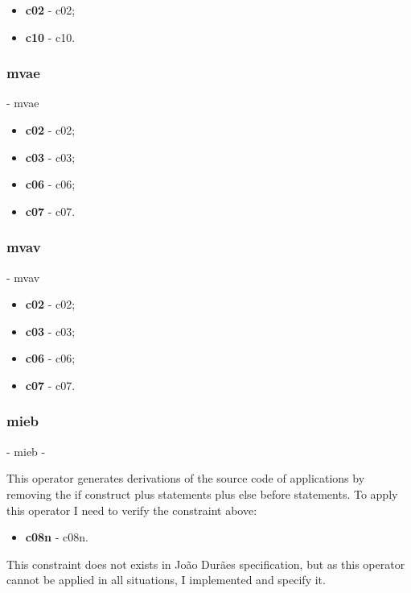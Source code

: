 	\begin{itemize}
		\item \textbf{\acs{c02}} - \Acl{c02};
		\item \textbf{\acs{c10}} - \Acl{c10}.
	\end{itemize}

	\hypertarget{mvae}{}
	\subsubsection{\textbf{\acs{mvae}}} - \Acl{mvae}

	\begin{itemize}
		\item \textbf{\acs{c02}} - \Acl{c02};
		\item \textbf{\acs{c03}} - \Acl{c03};
		\item \textbf{\acs{c06}} - \Acl{c06};
		\item \textbf{\acs{c07}} - \Acl{c07}.
	\end{itemize}

	\hypertarget{mvav}{}
	\subsubsection{\textbf{\acs{mvav}}} - \Acl{mvav}

	\begin{itemize}
		\item \textbf{\acs{c02}} - \Acl{c02};
		\item \textbf{\acs{c03}} - \Acl{c03};
		\item \textbf{\acs{c06}} - \Acl{c06};
		\item \textbf{\acs{c07}} - \Acl{c07}.
	\end{itemize}

	\hypertarget{mieb}{}
	\subsubsection{\textbf{\acs{mieb}}} - \Acl{mieb} - 

	This operator generates derivations of the source code of applications by removing the if construct plus statements plus else before statements. To apply this operator I need to verify the constraint above:
	\begin{itemize}
		\item \textbf{\acs{c08n}} - \Acl{c08n}.
	\end{itemize}
	This constraint does not exists in João Durães specification, but as this operator cannot be applied in all situations, I implemented and specify it.

